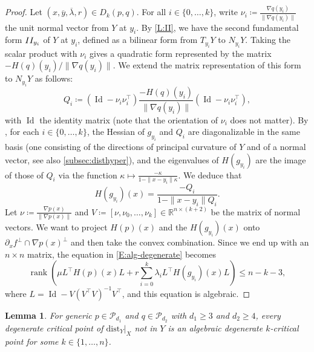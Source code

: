 \documentclass{amsart}
\newcommand{\R}{\mathbb{R}}
\newcommand{\dist}{{\mathrm{dist}_Y|_X}}
\newcommand{\Poly}{\mathscr{P}}
\def\Id{\operatorname{Id}}
\newtheorem{lemma}[subsubsection]{Lemma}
\theoremstyle{definition}
\theoremstyle{remark}
\begin{document}
\begin{proof}
Let $(x, \overline{y}, \overline{\lambda}, r) \in D_k(p, q)$. For all $i \in \{0, \ldots, k\}$, write $\nu_i \coloneqq \frac{\nabla q(y_i)}{\| \nabla q(y_i) \|}$ the unit normal vector from $Y$ at $y_i$. By \cref{L:II}, we have the second fundamental form $\textnormal{II}_{y_i}$ of $Y$ at $y_i$, defined as a bilinear form from $T_{y_i} Y$ to $N_{y_i} Y$. Taking the scalar product with $\nu_i$ gives a quadratic form represented by the matrix $-H(q)(y_i) / \| \nabla q(y_i) \|$. We extend the matrix representation of this form to $N_{y_i} Y$ as follows:
\[
Q_i \coloneqq (\Id - \nu_i \nu_i^\top) \frac{-H(q)(y_i)}{\| \nabla q(y_i) \|} (\Id - \nu_i \nu_i^\top),
\]
with $\Id$ the identity matrix (note that the orientation of $\nu_i$ does not matter). By \cite[Lemma 14.17]{GilbargTrudinger1983}, for each $i \in \{0, \ldots, k\}$, the Hessian of $g_{y_i}$ and $Q_i$ are diagonalizable in the same basis (one consisting of the directions of principal curvature of $Y$ and of a normal vector, see also \cref{subsec:disthyper}), and the eigenvalues of $H(g_{y_i})$ are the image of those of $Q_i$ via the function $\kappa \mapsto \frac{-\kappa}{1 - \| x - y_i \| \kappa}$. We deduce that
\[
H(g_{y_i})(x) = \frac{-Q_i}{1 - \| x - y_i \| Q_i}.
\]
Let $\nu \coloneqq \frac{\nabla p(x)}{\| \nabla p(x) \|}$ and $V \coloneqq [\nu, \nu_0, \ldots, \nu_k] \in \R^{n \times (k + 2)}$ be the matrix of normal vectors. We want to project $H(p)(x)$ and the $H(g_{y_i})(x)$ onto $\partial_x f^\bot \cap \nabla p(x)^\bot$ and then take the convex combination. Since we end up with an $n \times n$ matrix, the equation in \eqref{E:alg-degenerate} becomes
\[
\operatorname{rank} \left( \mu L^\top H(p)(x) L + r \sum_{i = 0}^k \lambda_i L^\top H(g_{y_i})(x) L \right) \leq n - k - 3,
\]
where $L = \Id - V (V^\top V)^{-1} V^\top$, and this equation is algebraic.
\end{proof}

\begin{lemma}
\label{L:deg-is-alg-deg}
For generic $p \in \Poly_{d_1}$ and $q \in \Poly_{d_2}$ with $d_1\geq 3$ and $d_2\geq 4$, every degenerate critical point of $\dist$ not in $Y$ is an algebraic degenerate $k$-critical point for some $k \in \{1, \ldots, n\}$.
\end{lemma}
\end{document}
